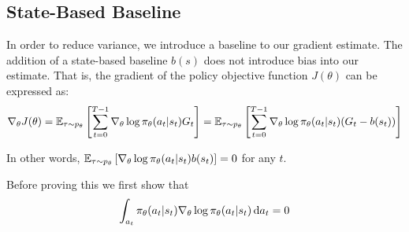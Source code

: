 \documentclass{article}
\begin{document}
\subsection{State-Based Baseline}
In order to reduce variance, we introduce a baseline to our gradient estimate. The addition of a state-based baseline $b(s)$ does not introduce bias into our estimate. That is, the gradient of the policy objective function $J(\theta)$ can be expressed as:
\begin{align*}
    \nabla_\theta J(\theta) = {\mathbb E}_{\tau \sim p_\theta} \left[\sum_{t=0}^{T-1} \nabla_\theta \log \pi_\theta(a_t \vert s_t) G_t\right] = {\mathbb E}_{\tau \sim p_\theta} \left[\sum_{t=0}^{T-1} \nabla_\theta \log \pi_\theta(a_t \vert s_t) (G_t - b(s_t))\right]
\end{align*}

In other words, ${\mathbb E}_{\tau \sim p_\theta} \left[\nabla_\theta \log \pi_\theta(a_t \vert s_t) b(s_t)\right] = 0$ for any $t$.


Before proving this we first show that
\begin{equation}\label{eq:baseline_proof_lemma}
    \int_{a_t} \pi_\theta(a_t \vert s_t) \nabla_\theta \log \pi_\theta(a_t \vert s_t) \, {\rm d}a_t = 0
\end{equation}
\end{document}

